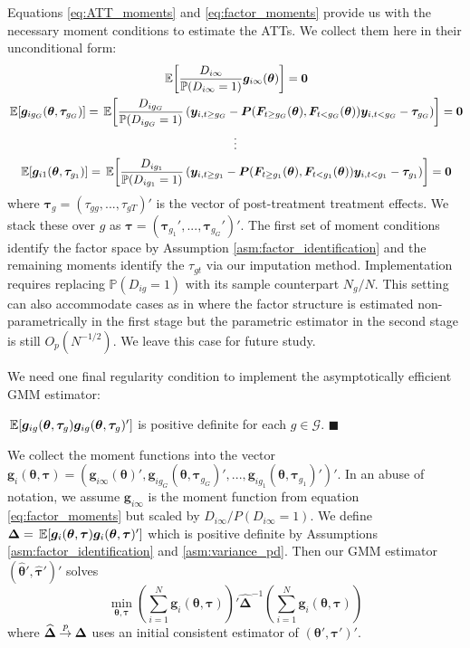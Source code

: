 \documentclass[12pt]{article}
\begin{document}
Equations \eqref{eq:ATT_moments} and \eqref{eq:factor_moments} provide us with the necessary moment conditions to estimate the ATTs. We collect them here in their unconditional form: 
\begin{gather*}
  \expec{\frac{D_{i\infty}}{\mathbb{P}(D_{i \infty} = 1)}\bm g_{i \infty}(\bm{\theta})} = \bm 0\\
  \expec{\bm g_{i g_G}(\bm{\theta}, \bm \tau_{g_G})} = \expec{ \frac{D_{ig_G}}{\mathbb{P}(D_{ig_G} = 1) } \left( \bm y_{i, t \geq g_G} - \bm P(\bm{F}_{t \geq g_G}(\bm{\theta}), \bm{F}_{t < g_G}(\bm{\theta})) \bm y_{i, t < g_G} - \bm \tau_{g_G} \right)} = \bm 0\\
  \vdots\\
  \expec{\bm g_{i 1}(\bm{\theta}, \bm \tau_{g_1})} = \expec{ \frac{D_{i g_1}}{\mathbb{P}(D_{i g_1} = 1) } \left( \bm y_{i, t \geq g_1} - \bm P(\bm{F}_{t \geq g_1}(\bm{\theta}), \bm{F}_{t < g_1}(\bm{\theta})) \bm y_{i, t < g_1} - \bm \tau_{g_1} \right)} = \bm 0
\end{gather*}
where $\bm \tau_g = (\tau_{gg},...,\tau_{gT})'$ is the vector of post-treatment treatment effects. We stack these over $g$ as $\bm \tau = (\bm \tau_{g_1}',...,\bm \tau_{g_G}')'$. The first set of moment conditions identify the factor space by Assumption \ref{asm:factor_identification} and the remaining moments identify the $\tau_{gt}$ via our imputation method. Implementation requires replacing $\mathbb{P}(D_{ig} = 1)$ with its sample counterpart $N_g/N$. This setting can also accommodate cases as in \citet{Hahn_Liao_Geert_2018} where the factor structure is estimated non-parametrically in the first stage but the parametric estimator in the second stage is still $O_p(N^{-1/2})$. We leave this case for future study.


We need one final regularity condition to implement the asymptotically efficient GMM estimator:
\begin{assumption}\label{asm:variance_pd}
  $\expec{\bm g_{ig}(\bm{\theta}, \bm \tau_g) \bm g_{ig}(\bm{\theta}, \bm \tau_g)'}$ is positive definite for each $g \in \mathcal{G}$. $\blacksquare$
\end{assumption}

We collect the moment functions into the vector $\bm g_i(\bm{\theta}, \bm \tau) = (\bm g_{i\infty}(\bm{\theta})', \bm g_{ig_G}(\bm{\theta}, \bm \tau_{g_G})',...,\bm g_{ig_1}(\bm{\theta}, \bm \tau_{g_1})')'$. In an abuse of notation, we assume $\bm g_{i\infty}$ is the moment function from equation \eqref{eq:factor_moments} but scaled by $D_{i\infty} / P(D_{i \infty} = 1)$. We define $\bm \Delta = \expec{\bm g_i(\bm{\theta}, \bm \tau) \bm g_i(\bm{\theta}, \bm \tau)'}$ which is positive definite by Assumptions \ref{asm:factor_identification} and \ref{asm:variance_pd}. Then our GMM estimator $(\widehat{ \bm{\theta}}', \widehat{ \bm \tau}')'$ solves
\begin{equation}\label{eq:minimization_problem}
  \min_{\bm{\theta}, \bm \tau} \left( \sum_{i = 1}^N \bm g_i(\bm{\theta}, \bm \tau) \right)' \widehat{\bm \Delta}^{-1} \left( \sum_{i = 1}^N \bm g_i(\bm{\theta}, \bm \tau) \right)
\end{equation}
where $\widehat{\bm \Delta} \mathbin{\overset{p}{\to}} \bm \Delta$ uses an initial consistent estimator of $(\bm{\theta}', \bm \tau')'$. 
\end{document}
